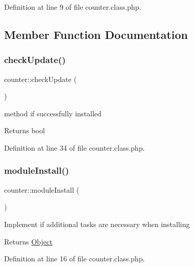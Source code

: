 Definition at line 9 of file counter.\+class.\+php.



\subsection{Member Function Documentation}
\hypertarget{classcounter_a41683d96129e79d63ce63ccde0efa2f0}{}\label{classcounter_a41683d96129e79d63ce63ccde0efa2f0} 
\subsubsection{\texorpdfstring{check\+Update()}{checkUpdate()}}
{\footnotesize\ttfamily counter\+::check\+Update (\begin{DoxyParamCaption}{ }\end{DoxyParamCaption})}

method if successfully installed

\begin{DoxyReturn}{Returns}
bool 
\end{DoxyReturn}


Definition at line 34 of file counter.\+class.\+php.

\hypertarget{classcounter_a05510fe21e12390a3cdee668b42cab5b}{}\label{classcounter_a05510fe21e12390a3cdee668b42cab5b} 
\subsubsection{\texorpdfstring{module\+Install()}{moduleInstall()}}
{\footnotesize\ttfamily counter\+::module\+Install (\begin{DoxyParamCaption}{ }\end{DoxyParamCaption})}

Implement if additional tasks are necessary when installing \begin{DoxyReturn}{Returns}
\hyperlink{classObject}{Object} 
\end{DoxyReturn}


Definition at line 16 of file counter.\+class.\+php.

\hypertarget{classcounter_a7c2e176fb177033a303aca925cddb046}{}\label{classcounter_a7c2e176fb177033a303aca925cddb046} 
